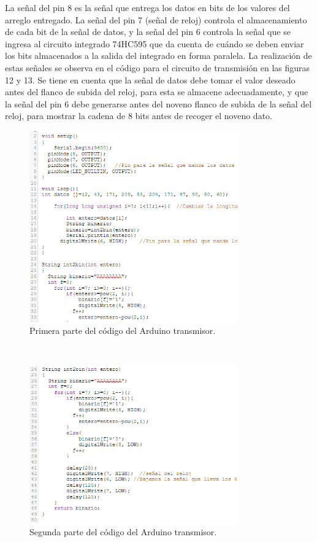 \documentclass{article}
\begin{document}
La señal del pin 8 es la señal que entrega los datos en bits de los valores del arreglo entregado. La señal del pin 7 (señal de reloj) controla el almacenamiento de cada bit de la señal de datos, y la señal del pin 6 controla la señal que se ingresa al circuito integrado 74HC595 que da cuenta de cuándo se deben enviar los bits almacenados a la salida del integrado en forma paralela. La realización de estas señales se observa en el código para el circuito de transmisión en las figuras 12 y 13. Se tiene en cuenta que la señal de datos debe tomar el valor deseado antes del flanco de subida del reloj, para esta se almacene adecuadamente, y que la señal del pin 6 debe generarse antes del noveno flanco de subida de la señal del reloj, para mostrar la cadena de 8 bits antes de recoger el noveno dato.\\

\newpage

\begin{figure}[h]
\includegraphics[width=9cm]{codigo_transmisor_1.PNG}
\centering
\caption{Primera parte del código del Arduino transmisor.}
\label{fig:codigo_transmisor_1.PNG}
\end{figure}
\cite{punto41}\\

\newpage

\begin{figure}[h]
\includegraphics[width=9cm]{codigo_transmisor_2.PNG}
\centering
\caption{Segunda parte del código del Arduino transmisor.}
\label{fig:codigo_transmisor_2.PNG}
\end{figure}
\end{document}
